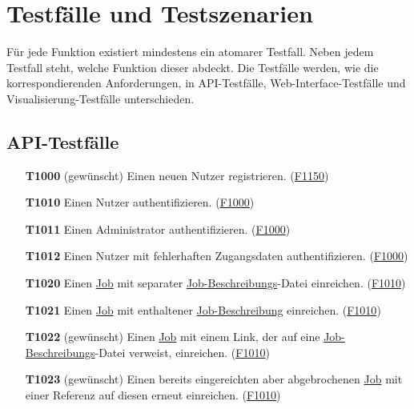 \section{Testfälle und Testszenarien}
Für jede Funktion existiert mindestens ein atomarer Testfall. Neben jedem Testfall steht, welche Funktion dieser abdeckt. Die Testfälle werden, wie die korrespondierenden Anforderungen, in \gls{API}-Testfälle, \gls{Web-Interface}-Testfälle und Visualisierung-Testfälle unterschieden.

\subsection{API-Testfälle}


\begin{itemize}

    \item[\textbf{T1000}] (gewünscht) Einen neuen \gls{Nutzer} registrieren. (\hyperref[FA:API:Registrierung von Nutzern]{F1150})
    
    \item[\textbf{T1010}] Einen \gls{Nutzer} authentifizieren. (\hyperref[FA:API:Authentifizieren von Nutzern]{F1000})
    
    \item[\textbf{T1011}] Einen \gls{Administrator} authentifizieren. (\hyperref[FA:API:Authentifizieren von Nutzern]{F1000})
    
    \item[\textbf{T1012}] Einen \gls{Nutzer} mit fehlerhaften Zugangsdaten authentifizieren. (\hyperref[FA:API:Authentifizieren von Nutzern]{F1000})
    
    \item[\textbf{T1020}] Einen \hyperref[B:Jobs]{Job} mit separater \hyperref[B:Job-Beschreibung]{Job-Beschreibungs}-Datei einreichen. (\hyperref[FA:API:Einreichen von Jobs]{F1010})
    
    \item[\textbf{T1021}] Einen \hyperref[B:Jobs]{Job} mit enthaltener \hyperref[B:Job-Beschreibung]{Job-Beschreibung} einreichen. (\hyperref[FA:API:Einreichen von Jobs]{F1010})
    
    \item[\textbf{T1022}] (gewünscht) Einen \hyperref[B:Jobs]{Job} mit einem Link, der auf eine \hyperref[B:Job-Beschreibung]{Job-Beschreibungs}-Datei verweist, einreichen. (\hyperref[FA:API:Einreichen von Jobs]{F1010})
    
    \item[\textbf{T1023}] (gewünscht) Einen bereits eingereichten aber abgebrochenen \hyperref[B:Jobs]{Job} mit einer Referenz auf diesen erneut einreichen. (\hyperref[FA:API:Einreichen von Jobs]{F1010})
    

\end{itemize}
